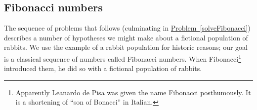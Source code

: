 \documentclass[10pt,]{book}
\theoremstyle{plain}
\theoremstyle{definition}
\theoremstyle{definition}
\numberwithin{equation}{chapter}
\begin{document}
\typeout{************************************************}
\typeout{************************************************}
\subsection[{Fibonacci numbers}]{Fibonacci numbers}\label{subsection-47}
\hypertarget{p-1235}{}%
The sequence of problems that follows (culminating in \hyperref[solveFibonacci]{Problem~\ref{solveFibonacci}}) describes a number of hypotheses we might make about a fictional population of rabbits. We use the example of a rabbit population for historic reasons; our goal is a classical sequence of numbers called Fibonacci numbers. When Fibonacci\footnote{Apparently Leanardo de Pisa was given the name Fibonacci posthumously. It is a shortening of ``son of Bonacci'' in Italian.\label{fn-14}} introduced them, he did so with a fictional population of rabbits.%
\typeout{************************************************}
\typeout{************************************************}
\end{document}
